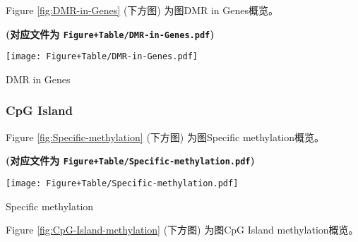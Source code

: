 \documentclass[
]{article}
\begin{document}
\begin{center}\vspace{1.5cm}\end{center}

Figure \ref{fig:DMR-in-Genes} (下方图) 为图DMR in Genes概览。

\textbf{(对应文件为 \texttt{Figure+Table/DMR-in-Genes.pdf})}

\def\@captype{figure}
\begin{center}
\texttt{[image: Figure+Table/DMR-in-Genes.pdf]}
\caption{DMR in Genes}\label{fig:DMR-in-Genes}
\end{center}

\begin{center}\vspace{1.5cm}\end{center}

\hypertarget{cpg-island}{%
\subsubsection{CpG Island}\label{cpg-island}}

\begin{center}\vspace{1.5cm}\end{center}

Figure \ref{fig:Specific-methylation} (下方图) 为图Specific methylation概览。

\textbf{(对应文件为 \texttt{Figure+Table/Specific-methylation.pdf})}

\def\@captype{figure}
\begin{center}
\texttt{[image: Figure+Table/Specific-methylation.pdf]}
\caption{Specific methylation}\label{fig:Specific-methylation}
\end{center}

\begin{center}\vspace{1.5cm}\end{center}

\begin{center}\vspace{1.5cm}\end{center}

Figure \ref{fig:CpG-Island-methylation} (下方图) 为图CpG Island methylation概览。
\end{document}
